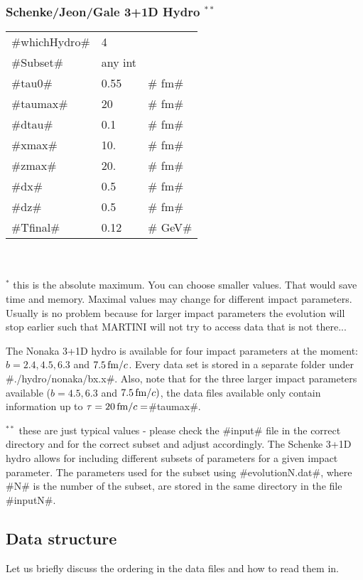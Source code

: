 \subsubsection{Schenke/Jeon/Gale 3+1D Hydro $^{**}$}
\label{schenkehydro}
\begin{tabular}{l l l}
   #whichHydro# & 4         &    ~  \\
   #Subset#     & any int   &    ~  \\
   #tau0#       & 0.55      & # fm# \\
   #taumax#     & 20        & # fm# \\
   #dtau#       & 0.1       & # fm# \\
   #xmax#       & 10.       & # fm# \\
   #zmax#       & 20.       & # fm# \\
   #dx#         & 0.5       & # fm# \\
   #dz#         & 0.5       & # fm# \\
   #Tfinal#     & 0.12      & # GeV# 
\end{tabular}\\~\\

$^*$ this is the absolute maximum. You can choose smaller values. 
That would save time and memory. Maximal values may change for different impact
parameters. Usually is no problem because for larger impact parameters the evolution
will stop earlier such that MARTINI will not try to access data that is not there...

The Nonaka 3+1D hydro is available for four impact parameters at the moment:
$b=2.4, 4.5, 6.3$ and $7.5\,{\rm fm}/c$. Every data set is stored in 
a separate folder under #./hydro/nonaka/bx.x#.
Also, note that for the three larger impact parameters available 
($b=4.5, 6.3$ and $7.5\,{\rm fm}/c)$, the data files available 
only contain information up to $\tau=20\,{\rm fm}/c=$#taumax#.

$^{**}$ these are just typical values - please check the #input# file in the correct directory and for
the correct subset and adjust accordingly. 
The Schenke 3+1D hydro allows for including different subsets of parameters for a given impact 
parameter. The parameters used for the subset using #evolutionN.dat#, where #N# is the number
of the subset, are stored in the same directory in the file #inputN#.



\newpage
\subsection{Data structure}
\label{structure}
Let us briefly discuss the ordering in the data files and how to read them in.
